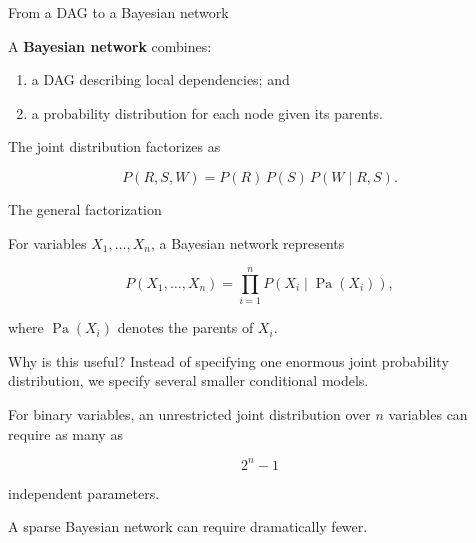 \documentclass[aspectratio=43,11pt]{beamer}
\begin{document}
\begin{frame}{From a DAG to a Bayesian network}

A \textbf{Bayesian network} combines:

\begin{enumerate}
  \item a DAG describing local dependencies; and
  \item a probability distribution for each node given its parents.
\end{enumerate}

\begin{center}
\end{center}

The joint distribution factorizes as

\[
P(R,S,W)
=
P(R)\,P(S)\,P(W\mid R,S).
\]

\end{frame}

\begin{frame}{The general factorization}

For variables \(X_1,\ldots,X_n\), a Bayesian network represents

\[
P(X_1,\ldots,X_n)
=
\prod_{i=1}^{n}
P\!\left(
  X_i \mid \operatorname{Pa}(X_i)
\right),
\]

where \(\operatorname{Pa}(X_i)\) denotes the parents of \(X_i\).

\begin{block}{Why is this useful?}
Instead of specifying one enormous joint probability distribution, we
specify several smaller conditional models.
\end{block}

For binary variables, an unrestricted joint distribution over \(n\)
variables can require as many as

\[
2^n-1
\]

independent parameters.

A sparse Bayesian network can require dramatically fewer.

\end{frame}
\end{document}
